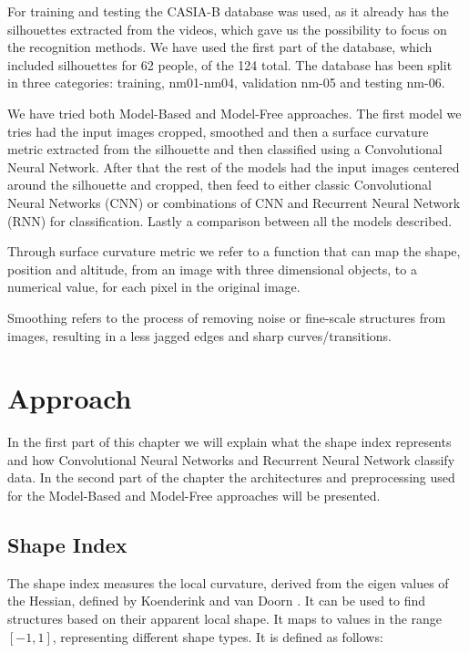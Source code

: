 \documentclass[12pt]{article}
\theoremstyle{definition}
\begin{document}
	For training and testing the CASIA-B database \cite{casia1}\cite{casia2}\cite{casia3} was used, as it already has the silhouettes extracted from the videos, which gave us the possibility to focus on the recognition methods. We have used the first part of the database, which included silhouettes for 62 people, of the 124 total. The database has been split in three categories: training, nm01-nm04, validation nm-05 and testing nm-06.

	We have tried both Model-Based and Model-Free approaches. The first model we tries had the input images cropped, smoothed and then a surface curvature metric extracted from the silhouette and then classified using a Convolutional Neural Network. After that the rest of the models had the input images centered around the silhouette and cropped, then feed to either classic Convolutional Neural Networks (CNN) or combinations of CNN and Recurrent Neural Network (RNN) for classification. Lastly a comparison between all the models described.

	Through surface curvature metric we refer to a function that can map the shape, position and altitude, from an image with three dimensional objects, to a numerical value, for each pixel in the original image.

	Smoothing refers to the process of removing noise or fine-scale structures from images, resulting in a less jagged edges and sharp curves/transitions.

	\newpage

	\section{Approach}
	\vspace{1cm}

	In the first part of this chapter we will explain what the shape index represents and how Convolutional Neural Networks and Recurrent Neural Network classify data. In the second part of the chapter the architectures and preprocessing used for the Model-Based and Model-Free approaches will be presented.

	\subsection{Shape Index}
	The shape index measures the local curvature, derived from the eigen values of the Hessian, defined by Koenderink and van Doorn \cite{shape-index}. It can be used to find structures based on their apparent local shape. It maps to values in the range $[-1, 1]$, representing different shape types. It is defined as follows:
\end{document}
